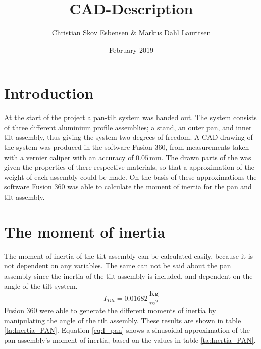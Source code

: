 \documentclass{article}
\title{CAD-Description}
\author{Christian Skov Esbensen \& Markus Dahl Lauritsen}
\date{February 2019}
\begin{document}
\section{Introduction}
At the start of the project a pan-tilt system was handed out. The system consists of three different aluminium profile assemblies; a stand, an outer pan, and inner tilt assembly, thus giving the system two degrees of freedom. 
A CAD drawing of the system was produced in the software Fusion 360, from measurements taken with a vernier caliper with an accuracy of $ 0.05 \,\mathrm{mm}$.
The drawn parts of the was given the properties of there respective materials, so that a approximation of the weight of each assembly could be made. On the basis of these approximations the software Fusion 360 was able to calculate the moment of inertia for the pan and tilt assembly.

\section{The moment of inertia}
The moment of inertia of the tilt assembly can be calculated easily, because it is not dependent on any variables. The same can not be said about the pan assembly since the inertia of the tilt assembly is included, and dependent on the angle of the tilt system.
\begin{equation}\label{eq:I_tilt}
    I_{Tilt} = 0.01682\, \frac{\mathrm{Kg}}{m^2}
\end{equation}
Fusion 360 were able to generate the different moments of inertia by manipulating the angle of the tilt assembly. These results are shown in table \ref{ta:Inertia_PAN}. Equation \eqref{eq:I_pan} shows a sinusoidal approximation of the pan assembly's moment of inertia, based on the values in table \ref{ta:Inertia_PAN}.
\end{document}

